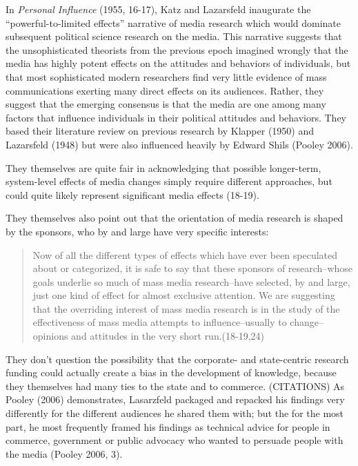 \documentclass[12pt,book]{article}
\begin{document}
In \emph{Personal Influence} (1955, 16-17), Katz and Lazarsfeld
inaugurate the ``powerful-to-limited effects'' narrative of media
research which would dominate subsequent political science research on
the media. This narrative suggests that the unsophisticated theorists
from the previous epoch imagined wrongly that the media has highly
potent effects on the attitudes and behaviors of individuals, but that
most sophisticated modern researchers find very little evidence of mass
communications exerting many direct effects on its audiences. Rather,
they suggest that the emerging consensus is that the media are one among
many factors that influence individuals in their political attitudes and
behaviors. They based their literature review on previous research by
Klapper (1950) and Lazarsfeld (1948) but were also influenced heavily by
Edward Shils (Pooley 2006).

They themselves are quite fair in acknowledging that possible
longer-term, system-level effects of media changes simply require
different approaches, but could quite likely represent significant media
effects (18-19).

They themselves also point out that the orientation of media research is
shaped by the sponsors, who by and large have very specific interests:

\begin{quote}
Now of all the different types of effects which have ever been
speculated about or categorized, it is safe to say that these sponsors
of research--whose goals underlie so much of mass media research--have
selected, by and large, just one kind of effect for almost exclusive
attention. We are suggesting that the overriding interest of mass media
research is in the study of the effectiveness of mass media attempts to
influence--usually to change--opinions and attitudes in the very short
run.(18-19,24)
\end{quote}

They don't question the possibility that the corporate- and
state-centric research funding could actually create a bias in the
development of knowledge, because they themselves had many ties to the
state and to commerce. (CITATIONS) As Pooley (2006) demonstrates,
Lasarzfeld packaged and repacked his findings very differently for the
different audiences he shared them with; but the for the most part, he
most frequently framed his findings as technical advice for people in
commerce, government or public advocacy who wanted to persuade people
with the media (Pooley 2006, 3).
\end{document}
